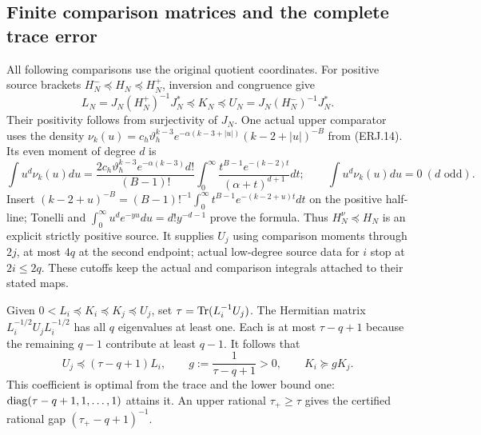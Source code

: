 \subsection{Finite comparison matrices and the complete trace error}
All following comparisons use the original quotient coordinates.
For positive source brackets $H_N^-\preceq H_N\preceq H_N^+$,
inversion and congruence give
\[
 L_N=J_N(H_N^+)^{-1}J_N^*\preceq K_N\preceq
 U_N=J_N(H_N^-)^{-1}J_N^*.\tag{ERJ.18}
\]
Their positivity follows from surjectivity of $J_N$.
One actual upper comparator uses the density
$\nu_k(u)=c_h\vartheta_h^{k-3}e^{-\alpha(k-3+|u|)}
(k-2+|u|)^{-B}$ from (ERJ.14). Its even moment of degree $d$ is
\[
 \int u^d\nu_k(u)du=
 \frac{2c_h\vartheta_h^{k-3}e^{-\alpha(k-3)}d!}{(B-1)!}
 \int_0^\infty\frac{t^{B-1}e^{-(k-2)t}}{(\alpha+t)^{d+1}}dt;
 \qquad \int u^d\nu_k(u)du=0\ (d\text{ odd}).\tag{ERJ.19}
\]
Insert $(k-2+u)^{-B}=(B-1)!^{-1}\int_0^\infty
t^{B-1}e^{-(k-2+u)t}dt$ on the positive half-line; Tonelli and
$\int_0^\infty u^de^{-yu}du=d!y^{-d-1}$ prove the formula.
Thus $H_N^\nu\preceq H_N$ is an explicit strictly positive source.
It supplies $U_j$ using comparison moments through $2j$, at most
$4q$ at the second endpoint; actual low-degree source data for $i$
stop at $2i\le2q$. These cutoffs keep the actual and comparison
integrals attached to their stated maps.

Given $0<L_i\preceq K_i\preceq K_j\preceq U_j$, set
$\tau=\operatorname{Tr}(L_i^{-1}U_j)$. The Hermitian matrix
$L_i^{-1/2}U_jL_i^{-1/2}$ has all $q$ eigenvalues at least one.
Each is at most $\tau-q+1$ because the remaining $q-1$ contribute
at least $q-1$. It follows that
\[
 U_j\preceq(\tau-q+1)L_i,\qquad
 g:=\frac1{\tau-q+1}>0,\qquad K_i\succeq gK_j.
 \tag{ERJ.20}
\]
This coefficient is optimal from the trace and the lower bound one:
$\operatorname{diag}(\tau-q+1,1,\ldots,1)$ attains it. An upper rational
$\tau_+\ge\tau$ gives the certified rational gap
$(\tau_+-q+1)^{-1}$.

